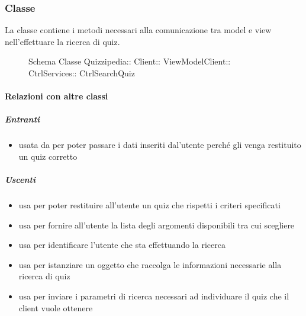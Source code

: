 \subsubsection{Classe }
La classe contiene i metodi necessari alla comunicazione tra model e view nell'effettuare la ricerca di quiz.
\begin{figure}[H]
\centering
\noindent{}
\caption[Schema Classe CtrlSearchQuiz]{Schema Classe Quizzipedia:: Client:: ViewModelClient:: CtrlServices:: CtrlSearchQuiz}
\end{figure}
\paragraph{Relazioni con altre classi}
\subparagraph{Entranti}
\begin{itemize}
\item usata da  per poter passare i dati inseriti dal'utente perché gli venga restituito un quiz corretto
\end{itemize}
\subparagraph{Uscenti}
\begin{itemize}
\item usa  per poter restituire all'utente un quiz che rispetti i criteri specificati
\item usa  per fornire all'utente la lista degli argomenti disponibili tra cui scegliere
\item usa  per identificare l'utente che sta effettuando la ricerca
\item usa  per istanziare un oggetto che raccolga le informazioni necessarie alla ricerca di quiz
\item usa  per inviare i parametri di ricerca necessari ad individuare il quiz che il client vuole ottenere
\end{itemize}
